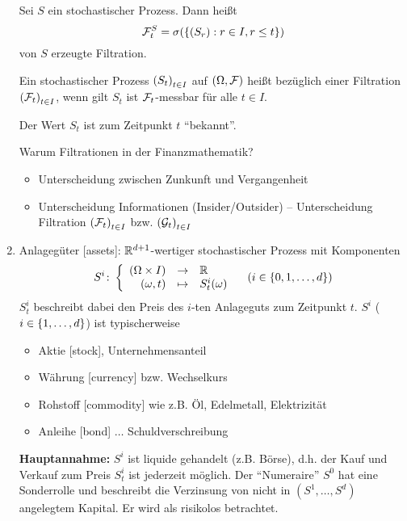 \begin{enumerate}[leftmargin=*]
	\begin{beispiel}
		Sei $S$ ein stochastischer Prozess. Dann heißt
		\begin{equation*}
			\mathcal{F}_t^S = \sigma( \left\{ (S_r) : r \in I, r \le t \right\} )
		\end{equation*}
		von $S$ erzeugte Filtration.
	\end{beispiel}
	
	\begin{definition}
		Ein stochastischer Prozess $\left( S_t \right)_{t \in I}$ auf $(\Omega, \mathcal{F})$ heißt  bezüglich einer Filtration $\left( \mathcal{F}_t \right)_{t \in I}$, wenn gilt $S_t$ ist $\mathcal{F}_t$-messbar für alle $t \in I$.
	\end{definition}
	
	\begin{*interpretation}
		Der Wert $S_t$ ist zum Zeitpunkt $t$ \enquote{bekannt}.
	\end{*interpretation}
	
	Warum Filtrationen in der Finanzmathematik?
	\begin{itemize}[nolistsep]
		\item Unterscheidung zwischen Zunkunft und Vergangenheit
		\item Unterscheidung Informationen (Insider/Outsider) -- Unterscheidung Filtration $\left( \mathcal{F}_t \right)_{t \in I}$ bzw. $\left( \mathcal{G}_t \right)_{t \in I}$
	\end{itemize}
	
	\item Anlagegüter [assets]: $\mathbb{R}^{d+1}$-wertiger stochastischer Prozess mit Komponenten
	\begin{equation*}
		S^i \colon \left\lbrace \begin{array}{rcl} (\Omega \times I) & \to & \mathbb{R} \\(\omega, t) & \mapsto & S_t^i(\omega) \end{array} \right. \quad (i \in \left\{ 0, 1, \dots , d \right\})
	\end{equation*}
	$S_t^i$ beschreibt dabei den Preis des $i$-ten Anlageguts zum Zeitpunkt $t$. $S^i$ ($i \in \left\{ 1, \dots , d \right\}$) ist typischerweise
	\begin{itemize}[nolistsep]
		\item Aktie [stock], Unternehmensanteil
		\item Währung [currency] bzw. Wechselkurs
		\item Rohstoff [commodity] wie z.B. Öl, Edelmetall, Elektrizität
		\item Anleihe [bond] $\dots$ Schuldverschreibung
	\end{itemize}
	
	\textbf{Hauptannahme:} $S^i$ ist liquide gehandelt (z.B. Börse), d.h. der Kauf und Verkauf zum Preis $S_t^i$ ist jederzeit möglich. 
	Der \enquote{Numeraire} $S^0$ hat eine Sonderrolle und beschreibt die Verzinsung von nicht in $(S^1, \dots , S^d)$ angelegtem Kapital. Er wird als risikolos betrachtet.
\end{enumerate}

